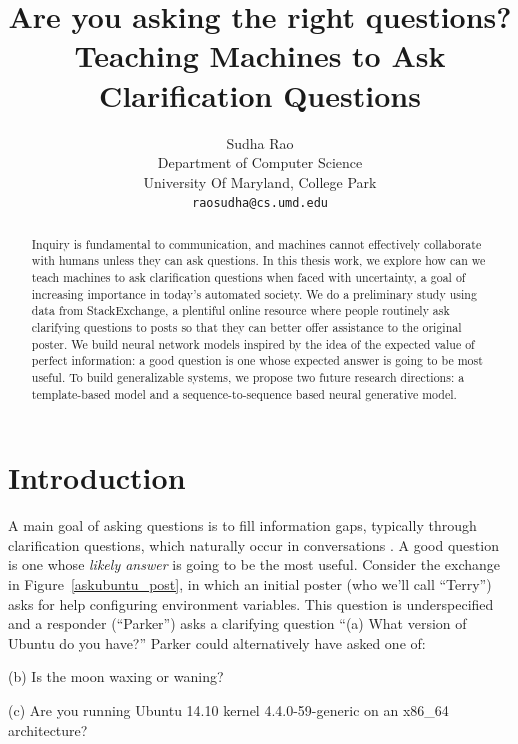\documentclass[11pt,a4paper]{article}
\author{Sudha Rao \\
  Department of Computer Science \\
  University Of Maryland, College Park \\
  {\tt raosudha@cs.umd.edu}}
\title{Are you asking the right questions? \\ Teaching Machines to Ask Clarification Questions}
\date{}
\begin{document}
\maketitle
\begin{abstract}
	
Inquiry is fundamental to communication, and machines cannot effectively collaborate with humans unless they can ask questions. In this thesis work, we explore how can we teach  machines to ask clarification questions when faced with uncertainty, a goal of increasing importance in today's automated society. We do a preliminary study using data from StackExchange, a plentiful online resource where people routinely ask clarifying questions to posts so that they can better offer assistance to the original poster. We build neural network models inspired by the idea of the expected value of perfect information: a good question is one whose expected answer is going to be most useful. To build generalizable systems, we propose two future research directions: a template-based model and a sequence-to-sequence based neural generative model.
\end{abstract}

\section{Introduction}\label{introduction}

A main goal of asking questions is to fill information gaps, typically through clarification questions, which naturally occur in conversations \cite{purver2004theory,ginzburg2012interactive}. 
A good question is one whose \emph{likely answer} is going to be the most useful.
Consider the exchange in Figure~\ref{askubuntu_post}, in which an initial poster (who we'll call ``Terry'') asks for help configuring environment variables.
This question is underspecified and a responder (``Parker'') asks a clarifying question ``\textsf{\small (a) What version of Ubuntu do you have?}''
Parker could alternatively have asked one of:

\textsf{\small(b) Is the moon waxing or waning?}

\textsf{\small(c) Are you running Ubuntu 14.10 kernel 4.4.0-59-generic on an x86\_64 architecture?}
\end{document}
